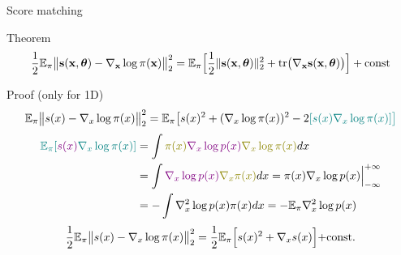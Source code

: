 \begin{frame}{Score matching}
	\begin{block}{Theorem}
		\vspace{-0.6cm}
		\[
			\frac{1}{2} \mathbb{E}_{\pi}\bigl\| \mathbf{s}(\mathbf{x}, \boldsymbol{\theta}) - \nabla_{\mathbf{x}} \log \pi(\mathbf{x}) \bigr\|^2_2 = \mathbb{E}_{\pi}\Bigr[ \frac{1}{2}\| \mathbf{s}(\mathbf{x}, \boldsymbol{\theta}) \|_2^2 + \text{tr}\bigl(\nabla_{\mathbf{x}} \mathbf{s}(\mathbf{x}, \boldsymbol{\theta})\bigr) \Bigr] + \text{const}
		\]
		\vspace{-0.6cm}
	\end{block}
	\begin{block}{Proof (only for 1D)}
		\vspace{-0.6cm}
		{\small
		\begin{multline*}
			\mathbb{E}_{\pi}\bigl\| s(x) - \nabla_x \log \pi(x) \bigr\|^2_2 = \mathbb{E}_{\pi} \bigl[ s(x)^2 + (\nabla_x \log \pi(x))^2 - 2{\color{teal}[s(x) \nabla_x \log \pi(x) ] \bigr] }
		\end{multline*}
		\vspace{-0.8cm}
		\begin{align*}
			{\color{teal}\bbE_{\pi} [{\color{violet}s(x) } \nabla_x \log \pi(x) ] } &= \int {\color{olive}\pi(x) {\color{violet}\nabla_x \log p(x)} \nabla_x \log \pi(x)} d x \\ 
			&= \int {\color{violet}\nabla_x \log p(x) } {\color{olive}\nabla_x \pi(x) } dx = \Bigl.\pi(x) \nabla_x \log p(x) \Bigr|_{-\infty}^{+\infty} \\
			&= - \int \nabla^2_x \log p(x)  \pi(x) dx =- \bbE_{\pi} \nabla^2_x \log p(x)
		\end{align*}
		\[
			\frac{1}{2} \mathbb{E}_{\pi}\bigl\| s(x) - \nabla_x \log \pi(x) \bigr\|^2_2 = \frac{1}{2} \mathbb{E}_{\pi} \Bigr[s(x)^2 + \nabla_x s(x) \Bigl]+ \text{const}.
		\]
		}
	\end{block}
\end{frame}
